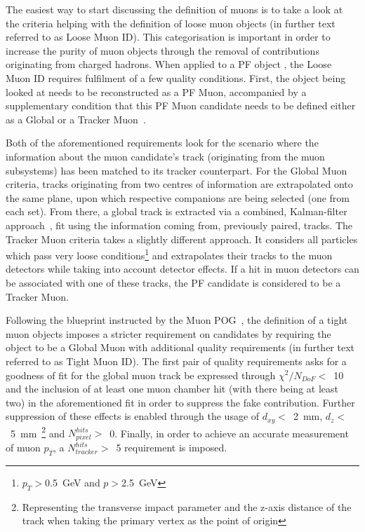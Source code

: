\hspace{10pt} The easiest way to start discussing the definition of muons is to take a look at the criteria helping with the definition of loose muon objects (in further text referred to as Loose Muon ID). This categorisation is important in order to increase the purity of muon objects through the removal of contributions originating from charged hadrons. When applied to a PF object%
, the Loose Muon ID requires fulfilment of a few quality conditions. First, the object being looked at needs to be reconstructed as a PF Muon, accompanied by a supplementary condition that this PF Muon candidate needs to be defined either as a Global or a Tracker Muon~\cite{paper:pf_muon_1,paper:pf_muon_2}. 

\hspace{10pt} Both of the aforementioned requirements look for the scenario where the information about the muon candidate's track (originating from the muon subsystems) has been matched to its tracker counterpart. For the Global Muon criteria, tracks originating from two centres of information are extrapolated onto the same plane, upon which respective companions are being selected (one from each set). From there, a global track is extracted via a combined, Kalman-filter approach~\cite{pf:kalman}, fit using the information coming from, previously paired, tracks. The Tracker Muon criteria takes a slightly different approach. It considers all particles which pass very loose conditions\footnote{$p_T>$0.5~GeV and $p>$2.5~GeV} and extrapolates their tracks to the muon detectors while taking into account detector effects. If a hit in muon detectors can be associated with one of these tracks, the PF candidate is considered to be a Tracker Muon.

\hspace{10pt} Following the blueprint instructed by the Muon POG~\cite{muon_pog_1}, the definition of a tight muon objects imposes a stricter requirement on candidates by requiring the object to be a Global Muon with additional quality requirements (in further text referred to as Tight Muon ID). The first pair of quality requirements asks for a goodness of fit for the global muon track be expressed through $\chi^2/N_{DoF}<$~10 and the inclusion of at least one muon chamber hit (with there being at least two) in the aforementioned fit in order to suppress the fake contribution. Further suppression of these effects is enabled through the usage of $d_{xy}<$~2~mm, $d_z<$~5~mm~\footnote{Representing the transverse impact parameter and the z-axis distance of the track when taking the primary vertex as the point of origin} and $N^{hits}_{pixel}>$~0. Finally, in order to achieve an accurate measurement of muon $p_T$, a $N_{tracker}^{hits}>$~5 requirement is imposed. 

